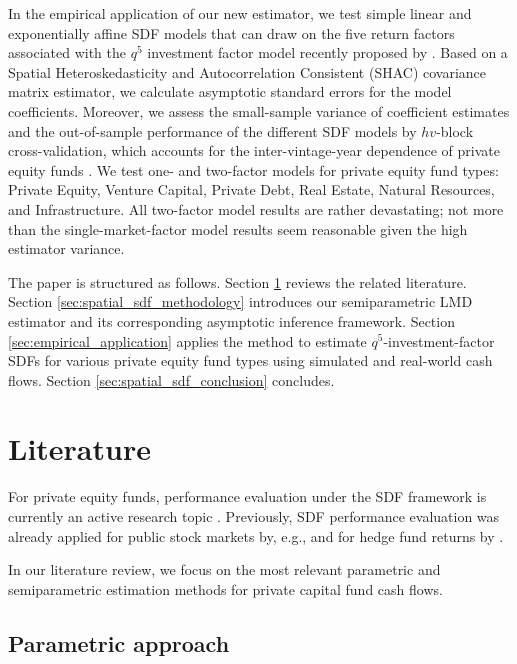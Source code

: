 \documentclass[12pt]{article}
\begin{document}
In the empirical application of our new estimator, we test simple linear and exponentially affine SDF models that can draw on the five return factors associated with the $q^5$ investment factor model recently proposed by \cite{HXZ20}.
Based on a Spatial Heteroskedasticity and Autocorrelation Consistent (SHAC) covariance matrix estimator, we calculate asymptotic standard errors for the model coefficients.
Moreover, we assess the small-sample variance of coefficient estimates and the out-of-sample performance of the different SDF models by $hv$-block cross-validation, which accounts for the inter-vintage-year dependence of private equity funds \citep{R00}.
We test one- and two-factor models for private equity fund types: Private Equity, Venture Capital, Private Debt, Real Estate, Natural Resources, and Infrastructure.
All two-factor model results are rather devastating; not more than the single-market-factor model results seem reasonable given the high estimator variance.

The paper is structured as follows. 
Section \ref{sec:literature} reviews the related literature.
Section \ref{sec:spatial_sdf_methodology} introduces our semiparametric LMD estimator and its corresponding asymptotic inference framework.
Section \ref{sec:empirical_application} applies the method to estimate $q^5$-investment-factor SDFs for various private equity fund types using simulated and real-world cash flows.
Section \ref{sec:spatial_sdf_conclusion} concludes.



\section{Literature}
\label{sec:literature}

For private equity funds, performance evaluation under the SDF framework is currently an active research topic \citep{DLP12,FNP12,B14,B16a,B16b,KN16,ACGP18,GSW19}.
Previously, SDF performance evaluation was already applied for public stock markets by, e.g., \cite{FFJT02} and for hedge fund returns by \cite{LXZ16}.

In our literature review, we focus on the most relevant parametric and semiparametric estimation methods for private capital fund cash flows.


\subsection{Parametric approach}
\end{document}
